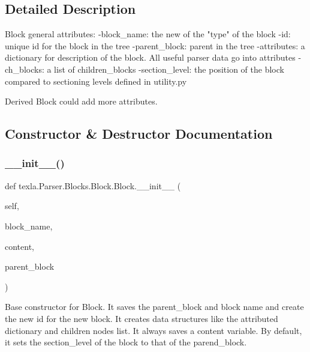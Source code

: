 \subsection{Detailed Description}
\begin{DoxyVerb}Block general attributes:
-block_name: the new of the "type" of the block
-id: unique id for the block in the tree
-parent_block: parent in the tree
-attributes: a dictionary for description of the block.
    All useful parser data go into attributes
-ch_blocks: a list of children_blocks
-section_level: the position of the block compared to
    sectioning levels defined in utility.py

Derived Block could add more attributes.
\end{DoxyVerb}
 

\subsection{Constructor \& Destructor Documentation}
\hypertarget{classtexla_1_1Parser_1_1Blocks_1_1Block_1_1Block_af80ceabfc4227532e63921f3d8387cfb}{}\label{classtexla_1_1Parser_1_1Blocks_1_1Block_1_1Block_af80ceabfc4227532e63921f3d8387cfb} 
\subsubsection{\texorpdfstring{\+\_\+\+\_\+init\+\_\+\+\_\+()}{\_\_init\_\_()}}
{\footnotesize\ttfamily def texla.\+Parser.\+Blocks.\+Block.\+Block.\+\_\+\+\_\+init\+\_\+\+\_\+ (\begin{DoxyParamCaption}\item[{}]{self,  }\item[{}]{block\+\_\+name,  }\item[{}]{content,  }\item[{}]{parent\+\_\+block }\end{DoxyParamCaption})}

\begin{DoxyVerb}Base constructor for Block.
It saves the parent_block and block name and create
the new id for the new block. It creates data structures
like the attributed dictionary and children nodes list.
It always saves a content variable.
By default, it sets the section_level of the block
to that of the parend_block.
\end{DoxyVerb}
 

